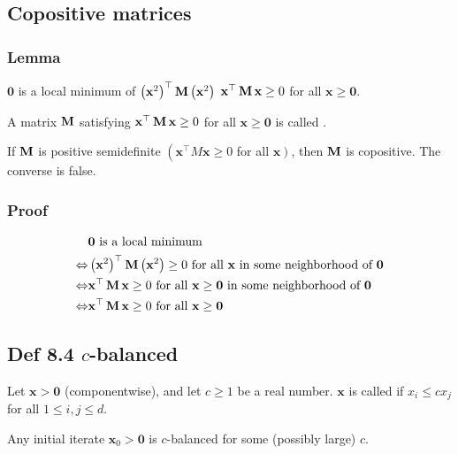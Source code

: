 \subsection*{Copositive matrices}
\subsubsection*{Lemma}
$\mathbf{0}$ is a local minimum of $\left(\mathbf{x}^{2}\right)^{\top} \operatorname{\boldsymbol{\mathbf{M}}}\left(\mathbf{x}^{2}\right)$  $\mathbf{x}^{\top} \operatorname{\boldsymbol{\mathbf{M}}} \mathbf{x} \geq 0$ for all $\mathbf{x} \geq \mathbf{0}$.

A matrix $\operatorname{\boldsymbol{\mathbf{M}}}$ satisfying $\mathbf{x}^{\top} \operatorname{\boldsymbol{\mathbf{M}}} \mathbf{x} \geq 0$ for all $\mathbf{x} \geq \mathbf{0}$ is called .

If $\operatorname{\boldsymbol{\mathbf{M}}}$ is positive semidefinite $\left(\mathbf{x}^{\top} M \mathbf{x} \geq 0\right.$ for all $\left.\mathbf{x}\right)$, then $\operatorname{\boldsymbol{\mathbf{M}}}$ is copositive. The converse is false.

\subsubsection*{Proof}
$$
\begin{aligned}
&\mathbf{0} \text{ is a local minimum}\\
\Leftrightarrow& \left(\mathbf{x}^{2}\right)^{\top} \operatorname{\boldsymbol{\mathbf{M}}}\left(\mathbf{x}^{2}\right) \geq 0 \text { for all } \mathbf{x} \text { in some neighborhood of } \mathbf{0} \\
\Leftrightarrow&  \mathbf{x}^{\top} \operatorname{\boldsymbol{\mathbf{M}}} \mathbf{x} \geq 0 \text { for all } \mathbf{x} \geq \mathbf{0} \text { in some neighborhood of } \mathbf{0} \\
\Leftrightarrow& \mathbf{x}^{\top} \operatorname{\boldsymbol{\mathbf{M}}} \mathbf{x} \geq 0 \text { for all } \mathbf{x} \geq \mathbf{0}
\end{aligned}
$$







\subsection*{Def 8.4 $c$-balanced}
Let $\mathbf{x}>\mathbf{0}$ (componentwise), and let $c \geq 1$ be a real number. $\mathbf{x}$ is called  if $x_{i} \leq c x_{j}$ for all $1 \leq i, j \leq d$.

Any initial iterate $\mathbf{x}_{0}>\mathbf{0}$ is $c$-balanced for some (possibly large) $c$.








